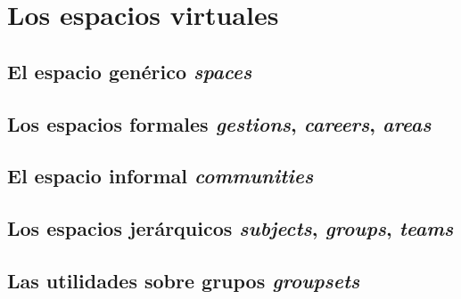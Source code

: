 \chapter{Los espacios virtuales}

\section{El espacio genérico \emph{spaces}}
\section{Los espacios formales \emph{gestions}, \emph{careers}, \emph{areas}}
\section{El espacio informal \emph{communities}}
\section{Los espacios jerárquicos \emph{subjects}, \emph{groups}, \emph{teams}}
\section{Las utilidades sobre grupos \emph{groupsets}}